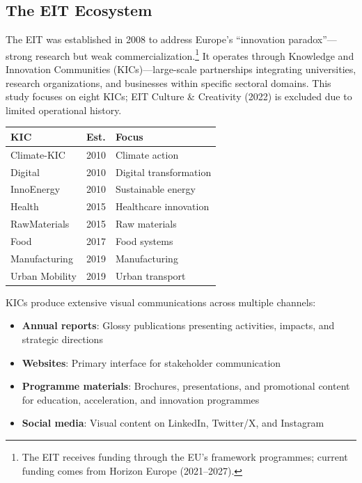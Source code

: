 \documentclass[../main.tex]{subfiles}
\begin{document}
\subsection{The EIT Ecosystem}

The EIT was established in 2008 to address Europe's ``innovation paradox''---strong research but weak commercialization.\footnote{The EIT receives funding through the EU's framework programmes; current funding comes from Horizon Europe (2021--2027).} It operates through Knowledge and Innovation Communities (KICs)---large-scale partnerships integrating universities, research organizations, and businesses within specific sectoral domains. This study focuses on eight KICs; EIT Culture \& Creativity (2022) is excluded due to limited operational history.

\begin{margintable}
\centering
\small
\begin{tabular}{lll}
\toprule
\textbf{KIC} & \textbf{Est.} & \textbf{Focus} \\
\midrule
Climate-KIC & 2010 & Climate action \\
Digital & 2010 & Digital transformation \\
InnoEnergy & 2010 & Sustainable energy \\
Health & 2015 & Healthcare innovation \\
RawMaterials & 2015 & Raw materials \\
Food & 2017 & Food systems \\
Manufacturing & 2019 & Manufacturing \\
Urban Mobility & 2019 & Urban transport \\
\bottomrule
\end{tabular}
\caption{EIT KICs overview}
\end{margintable}

KICs produce extensive visual communications across multiple channels:

\begin{itemize}
    \item \textbf{Annual reports}: Glossy publications presenting activities, impacts, and strategic directions
    \item \textbf{Websites}: Primary interface for stakeholder communication
    \item \textbf{Programme materials}: Brochures, presentations, and promotional content for education, acceleration, and innovation programmes
    \item \textbf{Social media}: Visual content on LinkedIn, Twitter/X, and Instagram
\end{itemize}
\end{document}

